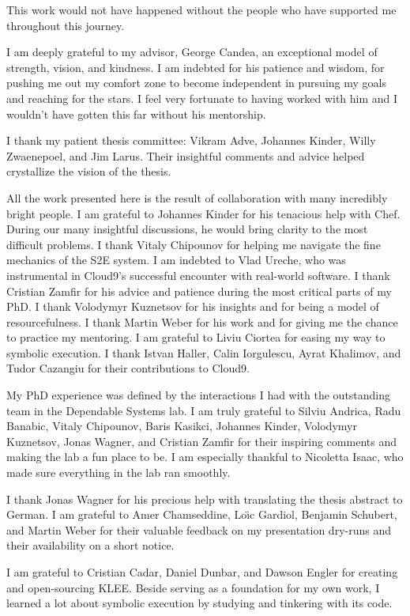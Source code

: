 This work would not have happened without the people who have supported me throughout this journey.


I am deeply grateful to my advisor, George Candea, an exceptional model of strength, vision, and kindness.
%
I am indebted for his patience and wisdom, for pushing me out my comfort zone to become independent in pursuing my goals and reaching for the stars.  I feel very fortunate to having worked with him and I wouldn't have gotten this far without his mentorship.


I thank my patient thesis committee: Vikram Adve, Johannes Kinder, Willy Zwaenepoel, and Jim Larus.  Their insightful comments and advice helped crystallize the vision of the thesis.


All the work presented here is the result of collaboration with many incredibly bright people.
%
I am grateful to Johannes Kinder for his tenacious help with Chef.  During our many insightful discussions, he would bring clarity to the most difficult problems.
%
I thank Vitaly Chipounov for helping me navigate the fine mechanics of the S2E system.
%
I am indebted to Vlad Ureche, who was instrumental in Cloud9's successful encounter with real-world software.
%
I thank Cristian Zamfir for his advice and patience during the most critical parts of my PhD.
%
I thank Volodymyr Kuznetsov for his insights and for being a model of resourcefulness.
%
I thank Martin Weber for his work and for giving me the chance to practice my mentoring. 
%
I am grateful to Liviu Ciortea for easing my way to symbolic execution.
%
I thank Istvan Haller, Calin Iorgulescu, Ayrat Khalimov, and Tudor Cazangiu for their contributions to Cloud9.


My PhD experience was defined by the interactions I had with the outstanding team in the Dependable Systems lab.  I am truly grateful to Silviu Andrica, Radu Banabic, Vitaly Chipounov, Baris Kasikci, Johannes Kinder, Volodymyr Kuznetsov, Jonas Wagner, and Cristian Zamfir for their inspiring comments and making the lab a fun place to be.
%
I am especially thankful to Nicoletta Isaac, who made sure everything in the lab ran smoothly.

I thank Jonas Wagner for his precious help with translating the thesis abstract to German.
%
I am grateful to Amer Chamseddine, Lo\"{\i}c Gardiol, Benjamin Schubert, and Martin Weber for their valuable feedback on my presentation dry-runs and their availability on a short notice.


I am grateful to Cristian Cadar, Daniel Dunbar, and Dawson Engler for creating and open-sourcing KLEE.  Beside serving as a foundation for my own work, I learned a lot about symbolic execution by studying and tinkering with its code.


